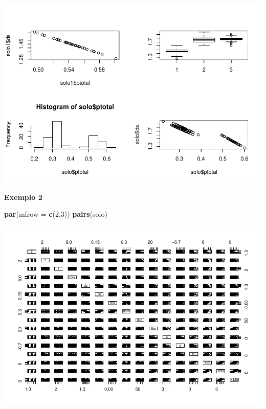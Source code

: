 \documentclass[]{book}
\newenvironment{Shaded}{\begin{snugshade}}{\end{snugshade}}
\newcommand{\DataTypeTok}[1]{\textcolor[rgb]{0.13,0.29,0.53}{#1}}
\newcommand{\DecValTok}[1]{\textcolor[rgb]{0.00,0.00,0.81}{#1}}
\newcommand{\KeywordTok}[1]{\textcolor[rgb]{0.13,0.29,0.53}{\textbf{#1}}}
\newcommand{\NormalTok}[1]{#1}
\newcommand{\OperatorTok}[1]{\textcolor[rgb]{0.81,0.36,0.00}{\textbf{#1}}}
\begin{document}
\includegraphics{TudodoR_files/figure-latex/unnamed-chunk-180-1.pdf}

\textbf{Exemplo 2}

\begin{Shaded}
\begin{Highlighting}[]
\KeywordTok{par}\NormalTok{(}\DataTypeTok{mfrow =} \KeywordTok{c}\NormalTok{(}\DecValTok{2}\NormalTok{,}\DecValTok{3}\NormalTok{))}
\KeywordTok{pairs}\NormalTok{(solo)}
\end{Highlighting}
\end{Shaded}

\includegraphics{TudodoR_files/figure-latex/unnamed-chunk-181-1.pdf}

\begin{Shaded}
\end{Shaded}
\end{document}

